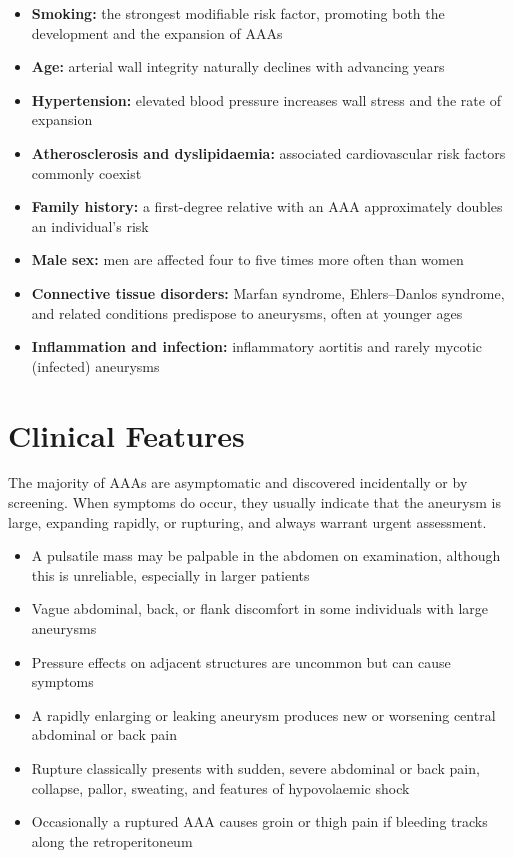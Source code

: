 \begin{itemize}
    \item \textbf{Smoking:} the strongest modifiable risk factor, promoting both the development and the expansion of AAAs
    \item \textbf{Age:} arterial wall integrity naturally declines with advancing years
    \item \textbf{Hypertension:} elevated blood pressure increases wall stress and the rate of expansion
    \item \textbf{Atherosclerosis and dyslipidaemia:} associated cardiovascular risk factors commonly coexist
    \item \textbf{Family history:} a first-degree relative with an AAA approximately doubles an individual's risk
    \item \textbf{Male sex:} men are affected four to five times more often than women
    \item \textbf{Connective tissue disorders:} Marfan syndrome, Ehlers--Danlos syndrome, and related conditions predispose to aneurysms, often at younger ages
    \item \textbf{Inflammation and infection:} inflammatory aortitis and rarely mycotic (infected) aneurysms
\end{itemize}

\section*{Clinical Features}
The majority of AAAs are asymptomatic and discovered incidentally or by screening. When symptoms do occur, they usually indicate that the aneurysm is large, expanding rapidly, or rupturing, and always warrant urgent assessment.

\begin{itemize}
    \item A pulsatile mass may be palpable in the abdomen on examination, although this is unreliable, especially in larger patients
    \item Vague abdominal, back, or flank discomfort in some individuals with large aneurysms
    \item Pressure effects on adjacent structures are uncommon but can cause symptoms
    \item A rapidly enlarging or leaking aneurysm produces new or worsening central abdominal or back pain
    \item Rupture classically presents with sudden, severe abdominal or back pain, collapse, pallor, sweating, and features of hypovolaemic shock
    \item Occasionally a ruptured AAA causes groin or thigh pain if bleeding tracks along the retroperitoneum
\end{itemize}


